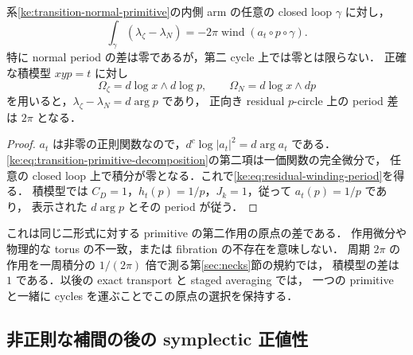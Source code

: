 \begin{corollary}
\label{ke:transition-residual-period}
系\ref{ke:transition-normal-primitive}の内側 arm の任意の closed loop $\gamma$ に対し，
\begin{equation}\label{ke:eq:residual-winding-period}
 \int_\gamma(\lambda_\zeta-\lambda_N)
 =-2\pi\operatorname{wind}(a_t\circ p\circ\gamma).
\end{equation}
特に normal period の差は零であるが，第二 cycle 上では零とは限らない．
正確な積模型 $xyp=t$ に対し
\[
 \Omega_\zeta=d\log x\wedge d\log p,\qquad
 \Omega_N=d\log x\wedge dp
\]
を用いると，$\lambda_\zeta-\lambda_N=d\arg p$ であり，
正向き residual $p$-circle 上の period 差は $2\pi$ となる．
\end{corollary}
\begin{proof}
$a_t$ は非零の正則関数なので，$d^c\log|a_t|^2=d\arg a_t$ である．
\eqref{ke:eq:transition-primitive-decomposition}の第二項は一価関数の完全微分で，
任意の closed loop 上で積分が零となる．これで\eqref{ke:eq:residual-winding-period}を得る．
積模型では $C_D=1$，$h_t(p)=1/p$，$J_k=1$，従って $a_t(p)=1/p$ であり，
表示された $d\arg p$ とその period が従う．
\end{proof}

これは同じ二形式に対する primitive の第二作用の原点の差である．
作用微分や物理的な torus の不一致，または fibration の不存在を意味しない．
周期 $2\pi$ の作用を一周積分の $1/(2\pi)$ 倍で測る第\ref{sec:necks}節の規約では，
積模型の差は $1$ である．以後の exact transport と staged averaging では，
一つの primitive と一緒に cycles を運ぶことでこの原点の選択を保持する．

\subsection{非正則な補間の後の symplectic 正値性}

